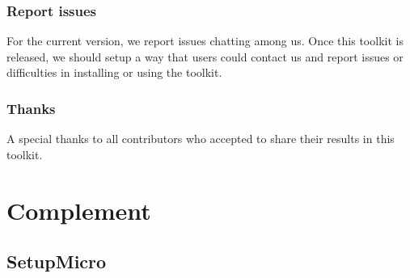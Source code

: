\documentclass[letterpaper,10pt,english]{sphinxmanual}
\begin{document}
\subsection{Report issues}
\label{\detokenize{source/miscelaneous:report-issues}}\label{\detokenize{source/miscelaneous:id3}}
\sphinxAtStartPar
For the current version, we report issues chatting among us.
Once this toolkit is released, we should setup a way that users could contact us and report issues or difficulties in installing or using the toolkit.


\subsection{Thanks}
\label{\detokenize{source/miscelaneous:thanks}}\label{\detokenize{source/miscelaneous:id4}}
\sphinxAtStartPar
A special thanks to all contributors who accepted to share their results in this toolkit.


\chapter{Complement}
\label{\detokenize{index:complement}}
\sphinxstepscope


\section{SetupMicro}
\label{\detokenize{source/api/setup_micro:setupmicro}}\label{\detokenize{source/api/setup_micro::doc}}\label{\detokenize{source/api/setup_micro:module-nucleardatapy.setup_micro}}
\end{document}
